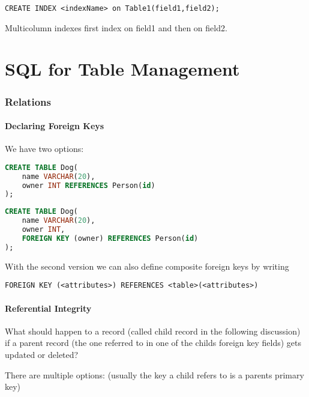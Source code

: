 \documentclass{sciposter}
\renewcommand{\t}[1]{\texttt{#1}}
\begin{document}
\begin{multicols}{3}
\t{CREATE INDEX <indexName> on Table1(field1,field2);}

Multicolumn indexes first index on field1 and then on field2.


\vfill\null 
\columnbreak


\part{SQL for Table Management}


\section*{Relations}

\subsection*{Declaring Foreign Keys}

We have two options:
\begin{lstlisting}[language=SQL]
CREATE TABLE Dog(
	name VARCHAR(20),
	owner INT REFERENCES Person(id)
);
\end{lstlisting}

\begin{lstlisting}[language=SQL]
CREATE TABLE Dog(
	name VARCHAR(20),
	owner INT,
	FOREIGN KEY (owner) REFERENCES Person(id)
);
\end{lstlisting}

With the second version we can also define composite foreign keys by writing

\t{FOREIGN KEY (<attributes>) REFERENCES <table>(<attributes>)}

\subsection*{Referential Integrity}

What should happen to a record (called child record in the following discussion) if a parent record (the one referred to in one of the childs foreign key fields) gets updated or deleted?

There are multiple options: (usually the key a child refers to is a parents primary key)


\end{multicols}
\end{document}
